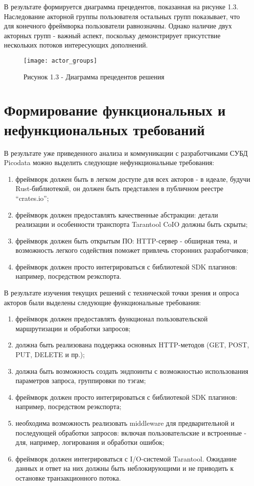 \documentclass[times,numbers=noenddot]{itmo-student-thesis}
\begin{document}
В результате формируется диаграмма прецедентов, показанная на рисунке 1.3.
Наследование акторной группы пользователя остальных групп показывает, что для конечного фреймворка пользователи равнозначны.
Однако наличие двух акторных групп - важный аспект, поскольку демонстрирует присутствие нескольких потоков интересующих дополнений.

\begin{figure}[!h]
	\caption*{Рисунок 1.3 - Диаграмма прецедентов решения}\label{fig3}
	\centering
	\texttt{[image: actor\_groups]}
\end{figure}

\section{Формирование функциональных и нефункциональных требований}\label{sec:requirements}

В результате уже приведенного анализа и коммуникации с разработчиками СУБД Picodata можно выделить следующие нефункциональные требования:

\begin{enumerate}[label=\arabic*.]
	\item фреймворк должен быть в легком доступе для всех акторов - в идеале, будучи Rust-библиотекой, он должен быть представлен в публичном реестре “crates.io”;
	\item фреймворк должен предоставлять качественные абстракции: детали реализации и особенности транспорта Tarantool CoIO должны быть скрыты;
	\item фреймворк должен быть открытым ПО: HTTP-сервер - обширная тема, и возможность легкого содействия поможет привлечь сторонних разработчиков;
	\item фреймворк должен просто интегрироваться с библиотекой SDK плагинов: например, посредством реэкспорта.
\end{enumerate}

В результате изучения текущих решений с технической точки зрения и опроса акторов были выделены следующие функциональные требования:

\begin{enumerate}[label=\arabic*.]
	\item фреймворк должен предоставлять функционал пользовательской маршрутизации и обработки запросов;
	\item должна быть реализована поддержка основных HTTP-методов (GET, POST, PUT, DELETE и пр.);
	\item должна быть возможность создать эндпоинты с возможностью использования параметров запроса, группировки по тэгам;
	\item фреймворк должен просто интегрироваться с библиотекой SDK плагинов: например, посредством реэкспорта;
	\item необходима возможность реализовать middleware для предварительной и последующей обработки запросов: включая пользовательские и встроенные - для, например, логирования и обработки ошибок;
	\item фреймворк должен интегрироваться с I/O-системой Tarantool. Ожидание данных и ответ на них должны быть неблокирующими и не приводить к остановке транзакционного потока.
\end{enumerate}
\end{document}
